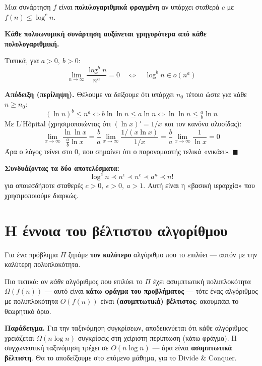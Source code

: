 \documentclass[11pt,a4paper]{article}
\begin{document}
Μια συνάρτηση $f$ είναι \textbf{πολυλογαριθμικά φραγμένη} αν υπάρχει σταθερά $c$
με $f(n) \le \log^c n$.

\begin{quoteblock}
\textbf{Κάθε πολυωνυμική συνάρτηση αυξάνεται γρηγορότερα από κάθε πολυλογαριθμική.}
\end{quoteblock}

Τυπικά, για $a > 0,\ b > 0$:
\[
\lim_{n \to \infty} \frac{\log^b n}{n^a} = 0 \quad \Leftrightarrow \quad \log^b n
\in o(n^a)
\]

\begin{examplebox}
\textbf{Απόδειξη (περίληψη).} Θέλουμε να δείξουμε ότι υπάρχει $n_0$ τέτοιο ώστε
για κάθε $n \ge n_0$:
\[
(\ln n)^b \le n^a \iff b \ln \ln n \le a \ln n \iff \ln \ln n \le \tfrac{a}{b}
\ln n
\]
Με L'Hôpital (χρησιμοποιώντας ότι $(\ln x)' = 1/x$ και τον κανόνα αλυσίδας):
\[
\lim_{x \to \infty} \frac{\ln \ln x}{\tfrac{a}{b} \ln x}
= \frac{b}{a} \lim_{x \to \infty} \frac{1/(x \ln x)}{1/x}
= \frac{b}{a} \lim_{x \to \infty} \frac{1}{\ln x} = 0
\]
Άρα ο λόγος τείνει στο $0$, που σημαίνει ότι ο παρονομαστής τελικά «νικάει».
$\blacksquare$
\end{examplebox}

\begin{keypoint}
\textbf{Συνδυάζοντας τα δύο αποτελέσματα:}
\[
\log^c n \prec n^\epsilon \prec n^c \prec a^n \prec n!
\]
για οποιεσδήποτε σταθερές $c > 0,\ \epsilon > 0,\ a > 1$. Αυτή είναι η «βασική
ιεραρχία» που χρησιμοποιούμε διαρκώς.
\end{keypoint}

\section{Η έννοια του βέλτιστου αλγορίθμου}

\begin{quoteblock}
Για ένα πρόβλημα $\Pi$ ζητάμε \textbf{τον καλύτερο} αλγόριθμο που το επιλύει ---
αυτόν με την καλύτερη πολυπλοκότητα.
\end{quoteblock}

Πιο τυπικά: αν \textit{κάθε} αλγόριθμος που επιλύει το $\Pi$ έχει ασυμπτωτική
πολυπλοκότητα $\Omega(f(n))$ --- αυτό είναι \textbf{κάτω φράγμα του προβλήματος}
--- τότε ένας αλγόριθμος με πολυπλοκότητα $O(f(n))$ είναι \textbf{(ασυμπτωτικά)
βέλτιστος}: ακουμπάει το θεωρητικό όριο.

\begin{intuition}
\textbf{Παράδειγμα.} Για την ταξινόμηση συγκρίσεων, αποδεικνύεται ότι κάθε
αλγόριθμος χρειάζεται $\Omega(n \log n)$ συγκρίσεις στη χείριστη περίπτωση (κάτω
φράγμα). Η συγχωνευτική ταξινόμηση τρέχει σε $O(n \log n)$ --- άρα είναι
\textbf{ασυμπτωτικά βέλτιστη}. Θα το αποδείξουμε στο επόμενο μάθημα, για το Divide
\& Conquer.
\end{intuition}
\end{document}
